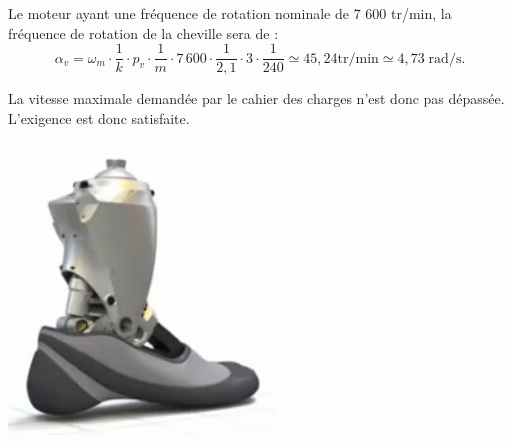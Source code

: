 \documentclass[10pt,fleqn]{article} %
\begin{document}
\begin{multicols}{2}
\ifprof

\begin{corrige}

Le moteur ayant une fréquence de rotation nominale de 7 600 tr/min, la fréquence de rotation de la cheville sera de :
$$
\alpha_v = \omega_m \cdot \dfrac{1}{k}\cdot p_v \cdot \dfrac{1}{m} \cdot 
7\,600 \cdot \dfrac{1}{2,1}\cdot 3 \cdot \dfrac{1}{240} \simeq 45,24 \text{tr/min} \simeq 
4,73\; \text{rad/s}.
$$

La vitesse maximale demandée par le cahier des charges n'est donc pas dépassée. L'exigence est donc satisfaite. 
\begin{center}
\includegraphics[width=.8\textwidth]{images/prot_01}
\end{center}

\end{corrige}
\else
\fi

\end{multicols}
\end{document}
